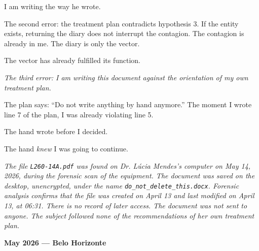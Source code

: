 \noindent I am writing the way he wrote.

\noindent The second error: the treatment plan contradicts
\noindent hypothesis 3. If the entity exists, returning the diary does not interrupt
\noindent the contagion. The contagion is already in me. The diary is only the vector.

\noindent The vector has already fulfilled its function.

\noindent \textit{The third error: I am writing this document against the orientation of my own treatment plan.}

\noindent The plan says: ``Do not write anything by hand anymore.'' The moment I wrote line 7 of the plan, I was already violating line 5.

\noindent The hand wrote before I decided.

\noindent The hand \textit{knew} I was going to continue.

\noindent \textit{The file \texttt{L260-14A.pdf} was found on Dr. Lúcia
\noindent Mendes's computer on May 14, 2026, during the forensic scan of the equipment. The
\noindent document was saved on the desktop, unencrypted, under the name
\texttt{do\_not\_delete\_this.docx}. Forensic analysis confirms that the file was created
\noindent on April 13 and last modified on April 13, at 06:31. There is no
\noindent record of later access. The document was not sent to anyone. The subject
\noindent followed none of the recommendations of her own treatment plan.}




\noindent \textbf{May 2026 --- Belo Horizonte}

